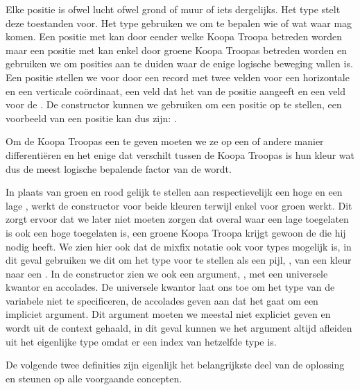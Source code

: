 
Elke positie is ofwel lucht ofwel grond of muur of iets dergelijks. Het type
 stelt deze toestanden voor. Het type 
gebruiken we om te bepalen wie of wat waar mag komen. Een positie met
  kan door eender welke Koopa Troopa betreden
worden maar een positie met   kan enkel door
groene Koopa Troopas betreden worden en gebruiken we om posities aan te duiden
waar de enige logische beweging vallen is. Een positie stellen we voor door een
record met twee velden voor een horizontale en een verticale coördinaat, een
veld dat het  van de positie aangeeft en een veld voor de
. De constructor  kunnen we gebruiken om een
positie op te stellen, een voorbeeld van een positie kan dus zijn: .

Om de Koopa Troopas een  te geven moeten we ze op een of
andere manier differentiëren en het enige dat verschilt tussen de Koopa Troopas
is hun kleur wat dus de meest logische bepalende factor van de
 wordt.


In plaats van groen en rood gelijk te stellen aan respectievelijk een hoge en
een lage , werkt de constructor  voor beide
kleuren terwijl  enkel voor groen werkt. Dit zorgt ervoor dat we
later niet moeten zorgen dat overal waar een lage  toegelaten
is ook een hoge  toegelaten is, een groene Koopa Troopa krijgt
gewoon de  die hij nodig heeft. We zien hier ook dat de mixfix
notatie ook voor types mogelijk is, in dit geval gebruiken we dit om het type
voor te stellen als een pijl, , van een kleur naar een
. In de constructor  zien we ook een argument,
, met een universele kwantor en accolades. De universele kwantor
laat ons toe om het type van de variabele  niet te specificeren, de
accolades geven aan dat het gaat om een impliciet argument. Dit argument moeten
we meestal niet expliciet geven en wordt uit de context gehaald, in dit geval
kunnen we het argument altijd afleiden uit het eigenlijke type omdat er een
index van hetzelfde type is.

De volgende twee definities zijn eigenlijk het belangrijkste deel van de
oplossing en steunen op alle voorgaande concepten.

